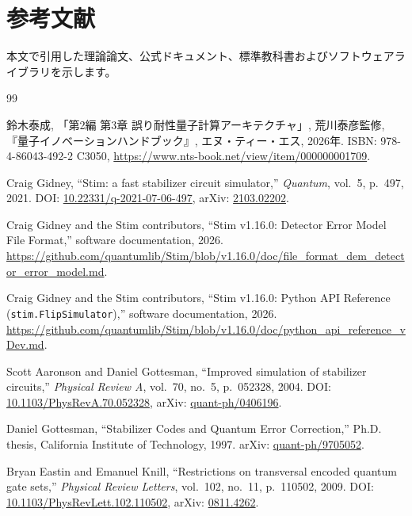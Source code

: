 \chapter{参考文献}\label{app:references}

本文で引用した理論論文、公式ドキュメント、標準教科書およびソフトウェアライブラリを示します。

\begin{thebibliography}{99}

鈴木泰成, 「第2編 第3章 誤り耐性量子計算アーキテクチャ」, 荒川泰彦監修, 『量子イノベーションハンドブック』, エヌ・ティー・エス, 2026年. ISBN: 978-4-86043-492-2 C3050, \url{https://www.nts-book.net/view/item/000000001709}.

Craig Gidney, ``Stim: a fast stabilizer circuit simulator,'' \emph{Quantum}, vol.~5, p.~497, 2021. DOI: \href{https://doi.org/10.22331/q-2021-07-06-497}{10.22331/q-2021-07-06-497}, arXiv: \href{https://arxiv.org/abs/2103.02202}{2103.02202}.

Craig Gidney and the Stim contributors, ``Stim v1.16.0: Detector Error Model File Format,'' software documentation, 2026. \url{https://github.com/quantumlib/Stim/blob/v1.16.0/doc/file_format_dem_detector_error_model.md}.

Craig Gidney and the Stim contributors, ``Stim v1.16.0: Python API Reference (\texttt{stim.FlipSimulator}),'' software documentation, 2026. \url{https://github.com/quantumlib/Stim/blob/v1.16.0/doc/python_api_reference_vDev.md}.

Scott Aaronson and Daniel Gottesman, ``Improved simulation of stabilizer circuits,'' \emph{Physical Review A}, vol.~70, no.~5, p.~052328, 2004. DOI: \href{https://doi.org/10.1103/PhysRevA.70.052328}{10.1103/PhysRevA.70.052328}, arXiv: \href{https://arxiv.org/abs/quant-ph/0406196}{quant-ph/0406196}.

Daniel Gottesman, ``Stabilizer Codes and Quantum Error Correction,'' Ph.D. thesis, California Institute of Technology, 1997. arXiv: \href{https://arxiv.org/abs/quant-ph/9705052}{quant-ph/9705052}.

Bryan Eastin and Emanuel Knill, ``Restrictions on transversal encoded quantum gate sets,'' \emph{Physical Review Letters}, vol.~102, no.~11, p.~110502, 2009. DOI: \href{https://doi.org/10.1103/PhysRevLett.102.110502}{10.1103/PhysRevLett.102.110502}, arXiv: \href{https://arxiv.org/abs/0811.4262}{0811.4262}.


\end{thebibliography}
